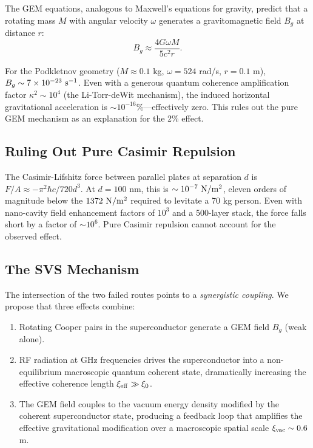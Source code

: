 \documentclass[12pt,a4paper]{article}
\begin{document}
The GEM equations, analogous to Maxwell's equations for gravity, predict that a rotating mass $M$ with angular velocity $\omega$ generates a gravitomagnetic field $B_g$ at distance $r$:
\begin{equation}
B_g \approx \frac{4G\omega M}{5c^2 r}.
\end{equation}

For the Podkletnov geometry ($M\approx 0.1$ kg, $\omega=524$ rad/s, $r=0.1$ m), $B_g\sim 7\times10^{-23}\ {\rm s^{-1}}$. Even with a generous quantum coherence amplification factor $\kappa^2\sim10^4$ (the Li-Torr-deWit mechanism), the induced horizontal gravitational acceleration is $\sim10^{-16}\%$---effectively zero. This rules out the pure GEM mechanism as an explanation for the 2\% effect.

\subsection{Ruling Out Pure Casimir Repulsion}\label{sec:casimir}

The Casimir-Lifshitz force between parallel plates at separation $d$ is $F/A\approx -\pi^2\hbar c/720d^3$. At $d=100$ nm, this is $\sim10^{-7}\ {\rm N/m^2}$, eleven orders of magnitude below the $1372\ {\rm N/m^2}$ required to levitate a 70 kg person. Even with nano-cavity field enhancement factors of $10^3$ and a 500-layer stack, the force falls short by a factor of $\sim10^6$. Pure Casimir repulsion cannot account for the observed effect.

\subsection{The SVS Mechanism}

The intersection of the two failed routes points to a \emph{synergistic coupling}. We propose that three effects combine:

\begin{enumerate}
    \item[\textbf{S1}] Rotating Cooper pairs in the superconductor generate a GEM field $B_g$ (weak alone).
    \item[\textbf{S2}] RF radiation at GHz frequencies drives the superconductor into a non-equilibrium macroscopic quantum coherent state, dramatically increasing the effective coherence length $\xi_{\rm eff}\gg\xi_0$.
    \item[\textbf{S3}] The GEM field couples to the vacuum energy density modified by the coherent superconductor state, producing a feedback loop that amplifies the effective gravitational modification over a macroscopic spatial scale $\xi_{\rm vac}\sim 0.6$ m.
\end{enumerate}
\end{document}
